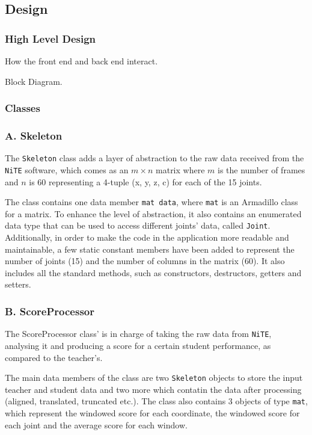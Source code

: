 \documentclass[10pt,a4paper]{article}
\begin{document}
\subsection{Design}
\subsubsection{High Level Design}
\begin{compactitem}
\item{How the front end and back end interact.}
\item{Block Diagram.}
\end{compactitem}
\subsubsection{Classes}
\subsubsection*{A. Skeleton}
\noindent 
The \texttt{Skeleton} class adds a layer of abstraction to the raw data received from the \texttt{NiTE} software, which comes as an $m\times n $ matrix where $m$ is the number of frames and $n$ is 60 representing a 4-tuple (x, y, z, c) for each of the 15 joints.

\noindent
The class contains one data member \texttt{mat data}, where \texttt{mat} is an Armadillo class for a matrix. To enhance the level of abstraction, it also contains an enumerated data type that can be used to access different joints' data, called \texttt{Joint}. Additionally, in order to make the code in the application more readable and maintainable, a few static constant members have been added to represent the number of joints (15) and the number of columns in the matrix (60). It also includes all the standard methods, such as constructors, destructors, getters and setters.

\subsubsection*{B. ScoreProcessor}
\noindent
The ScoreProcessor class' is in charge of taking the raw data from \texttt{NiTE}, analysing it and producing a score for a certain student performance, as compared to the teacher's.

\noindent 
The main data members of the class are two \texttt{Skeleton} objects to store the input teacher and student data and two more which contatin the data after processing (aligned, translated, truncated etc.). The class also contains 3 objects of type \texttt{mat}, which represent the windowed score for each coordinate, the windowed score for each joint and the average score for each window.
\end{document}

